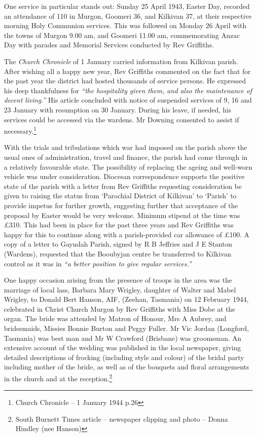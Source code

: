 One service in particular stands out: Sunday 25 April 1943, Easter Day, recorded an attendance of 110 in Murgon, Goomeri 36, and Kilkivan 37, at their respective morning Holy Communion services. This was followed on Monday 26 April with the towns of Murgon 9.00 am, and Goomeri 11.00 am, commemorating Anzac Day with parades and Memorial Services conducted by Rev Griffiths.

The \emph{Church Chronicle} of 1 January carried information from Kilkivan parish. After wishing all a happy new year, Rev Griffiths commented on the fact that for the past year the district had hosted thousands of service persons. He expressed his deep thankfulness for \emph{``the hospitality given them, and also the maintenance of decent living.''} His article concluded with notice of suspended services of 9, 16 and 23 January with resumption on 30 January. During his leave, if needed, his services could be accessed via the wardens. Mr Downing consented to assist if necessary.\footnote{Church Chronicle -- 1 January 1944 p.26}

With the trials and tribulations which war had imposed on the parish above the usual ones of administration, travel and finance, the parish had come through in a relatively favourable state. The possibility of replacing the ageing and well-worn vehicle was under consideration. Diocesan correspondence supports the positive state of the parish with a letter from Rev Griffiths requesting consideration be given to raising the status from `Parochial District of Kilkivan' to `Parish' to provide impetus for further growth, suggesting further that acceptance of the proposal by Easter would be very welcome. Minimum stipend at the time was £310. This had been in place for the past three years and Rev Griffiths was happy for this to continue along with a parish-provided car allowance of £100. A copy of a letter to Gayndah Parish, signed by R B Jeffries and J E Stanton (Wardens), requested that the Booubyjan centre be transferred to Kilkivan control as it was in \emph{``a better position to give regular services.''}

One happy occasion arising from the presence of troops in the area was the marriage of local lass, Barbara Mary Wrigley, daughter of Walter and Mabel Wrigley, to Donald Bert Hanson, AIF, (Zeehan, Tasmania) on 12 February 1944, celebrated in Christ Church Murgon by Rev Griffiths with Miss Dobe at the organ. The bride was attended by Matron of Honour, Mrs A Aubrey, and bridesmaids, Missies Bonnie Burton and Peggy Fuller. Mr Vic Jordan (Longford, Tasmania) was best man and Mr W Crawford (Brisbane) was groomsman. An extensive account of the wedding was published in the local newspaper, giving detailed descriptions of frocking (including style and colour) of the bridal party including mother of the bride, as well as of the bouquets and floral arrangements in the church and at the reception.\footnote{South Burnett Times article -- newspaper clipping and photo -- Donna Hindley (nee Hanson)}


